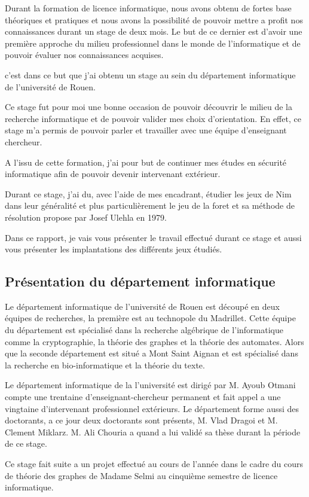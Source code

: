 Durant la formation de licence informatique, nous avons obtenu de fortes base théoriques et pratiques et nous avons la possibilité de pouvoir mettre a profit nos connaissances durant un stage de deux mois. Le but de ce dernier est d'avoir une première approche du milieu professionnel dans le monde de l'informatique et de pouvoir évaluer nos connaissances acquises.

c'est dans ce but que j'ai obtenu un stage au sein du département informatique de l’université de Rouen.

Ce stage fut pour moi une bonne occasion de pouvoir découvrir le milieu de la recherche informatique et de pouvoir valider mes choix d'orientation. En effet, ce stage m'a permis de pouvoir parler et travailler avec une équipe d'enseignant chercheur.

A l'issu de cette formation, j'ai pour but de continuer mes études en sécurité informatique afin de pouvoir devenir intervenant extérieur.

Durant ce stage, j'ai du, avec l'aide de mes encadrant, étudier les jeux de Nim dans leur généralité et plus particulièrement le jeu de la foret et sa méthode de résolution propose par Josef Ulehla en 1979.

Dans ce rapport, je vais vous présenter le travail effectué durant ce stage et aussi vous présenter les implantations des différents jeux étudiés.

\subsection{Présentation du département informatique}
\label{sub: Présentation du département informatique}

Le département informatique de l’université de Rouen est découpé en deux équipes de recherches, la première est au technopole du Madrillet. Cette équipe du département est spécialisé dans la recherche algébrique de l'informatique comme la cryptographie, la théorie des graphes et la théorie des automates. Alors que la seconde département est situé a Mont Saint Aignan et est spécialisé dans la recherche en bio-informatique et la théorie du texte.

Le département informatique de la l’université est dirigé par M. Ayoub Otmani compte une trentaine d'enseignant-chercheur permanent et fait appel a une vingtaine d'intervenant professionnel extérieurs. Le département forme aussi des doctorants, a ce jour deux doctorants sont présents, M. Vlad Dragoi et M. Clement Miklarz. M. Ali Chouria a quand a lui validé sa thèse durant la période de ce stage.

Ce stage fait suite a un projet effectué au cours de l’année dans le cadre du cours de théorie des graphes de Madame Selmi au cinquième semestre de licence informatique.